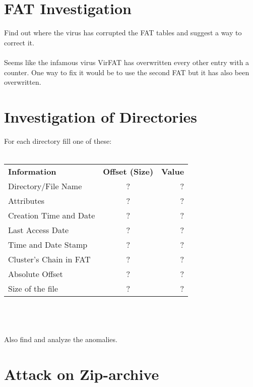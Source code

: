 \documentclass{article}
\begin{document}
\section{FAT Investigation}

Find out where the virus has corrupted the FAT tables and suggest a way to correct it.\\
\\
Seems like the infamous virus VirFAT has overwritten every other entry with a counter. One way to fix it would be to use the second FAT but it has also been overwritten.

\section{Investigation of Directories}

For each directory fill one of these:\\
\\
\begin{tabular}{l c r}
    \hline
    \textbf{Information} & \textbf{Offset (Size)} & \textbf{Value}\\
    Directory/File Name & ? & ? \\
    Attributes & ? & ? \\
    Creation Time and Date & ? & ? \\
    Last Access Date & ? & ? \\
    Time and Date Stamp & ? & ? \\
    Cluster’s Chain in FAT & ? & ? \\
    Absolute Offset & ? & ? \\
    Size of the file & ? & ? \\
    \hline
\end{tabular}
\\
\\
\\
Also find and analyze the anomalies.

\section{Attack on Zip-archive}
\end{document}
